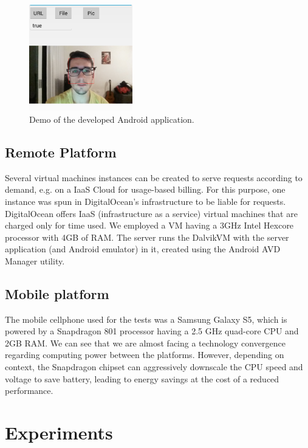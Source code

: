 \documentclass[10pt, conference, letterpaper]{IEEEtran}
\begin{document}
\begin{figure}[!t]
  \centering
  \includegraphics[width=0.4\textwidth]{imgs/app.png}
  \caption{Demo of the developed Android application.}
  \label{fig:exectime}
\end{figure}


  \subsection{Remote Platform}
  
  Several virtual machines instances can be created to serve requests according to demand, e.g. on a IaaS Cloud for usage-based billing. For this purpose, one instance was spun in DigitalOcean's infrastructure \cite{digitalocean} to be liable for requests. DigitalOcean offers IaaS (infrastructure as a service) virtual machines that are charged only for time used. We employed a VM having a 3GHz Intel Hexcore processor with 4GB of RAM. The server runs the DalvikVM with the server application (and Android emulator) in it, created using the Android AVD Manager \cite{androidavd} utility.

\subsection{Mobile platform}

  The mobile cellphone used for the tests was a Samsung Galaxy S5, which is powered by a Snapdragon 801 processor having a 2.5 GHz quad-core CPU and 2GB RAM. We can see that we are almost facing a technology convergence regarding computing power between the platforms. However, depending on context, the Snapdragon chipset can aggressively downscale the CPU speed and voltage to save battery, leading to energy savings at the cost of a reduced performance.

\section{Experiments}
\label{sec:experiments}
  
\end{document}

